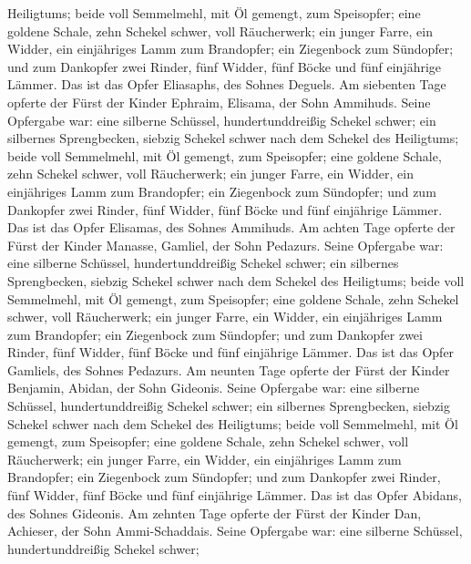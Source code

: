 Heiligtums; beide voll Semmelmehl, mit Öl gemengt, zum Speisopfer;
 eine goldene Schale, zehn Schekel schwer, voll
Räucherwerk;  ein junger Farre, ein Widder, ein
einjähriges Lamm zum Brandopfer;  ein Ziegenbock zum
Sündopfer;  und zum Dankopfer zwei Rinder, fünf Widder,
fünf Böcke und fünf einjährige Lämmer. Das ist das Opfer Eliasaphs, des
Sohnes Deguels.  Am siebenten Tage opferte der Fürst der
Kinder Ephraim, Elisama, der Sohn Ammihuds.  Seine
Opfergabe war: eine silberne Schüssel, hundertunddreißig Schekel schwer;
ein silbernes Sprengbecken, siebzig Schekel schwer nach dem Schekel des
Heiligtums; beide voll Semmelmehl, mit Öl gemengt, zum Speisopfer;
 eine goldene Schale, zehn Schekel schwer, voll
Räucherwerk;  ein junger Farre, ein Widder, ein
einjähriges Lamm zum Brandopfer;  ein Ziegenbock zum
Sündopfer;  und zum Dankopfer zwei Rinder, fünf Widder,
fünf Böcke und fünf einjährige Lämmer. Das ist das Opfer Elisamas, des
Sohnes Ammihuds.  Am achten Tage opferte der Fürst der
Kinder Manasse, Gamliel, der Sohn Pedazurs.  Seine
Opfergabe war: eine silberne Schüssel, hundertunddreißig Schekel schwer;
ein silbernes Sprengbecken, siebzig Schekel schwer nach dem Schekel des
Heiligtums; beide voll Semmelmehl, mit Öl gemengt, zum Speisopfer;
 eine goldene Schale, zehn Schekel schwer, voll
Räucherwerk;  ein junger Farre, ein Widder, ein
einjähriges Lamm zum Brandopfer;  ein Ziegenbock zum
Sündopfer;  und zum Dankopfer zwei Rinder, fünf Widder,
fünf Böcke und fünf einjährige Lämmer. Das ist das Opfer Gamliels, des
Sohnes Pedazurs.  Am neunten Tage opferte der Fürst der
Kinder Benjamin, Abidan, der Sohn Gideonis.  Seine
Opfergabe war: eine silberne Schüssel, hundertunddreißig Schekel schwer;
ein silbernes Sprengbecken, siebzig Schekel schwer nach dem Schekel des
Heiligtums; beide voll Semmelmehl, mit Öl gemengt, zum Speisopfer;
 eine goldene Schale, zehn Schekel schwer, voll
Räucherwerk;  ein junger Farre, ein Widder, ein
einjähriges Lamm zum Brandopfer;  ein Ziegenbock zum
Sündopfer;  und zum Dankopfer zwei Rinder, fünf Widder,
fünf Böcke und fünf einjährige Lämmer. Das ist das Opfer Abidans, des
Sohnes Gideonis.  Am zehnten Tage opferte der Fürst der
Kinder Dan, Achieser, der Sohn Ammi-Schaddais.  Seine
Opfergabe war: eine silberne Schüssel, hundertunddreißig Schekel schwer;
